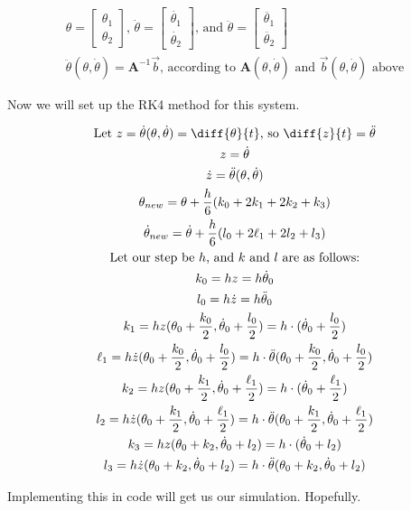\documentclass[]{article}
\begin{document}
\begin{gather*}
	\theta = 
	\begin{bmatrix}
		\theta_1 \\
		\theta_2
	\end{bmatrix} \text{, }
	\dot{\theta} = 
	\begin{bmatrix}
		\dot{\theta_1} \\
		\dot{\theta_2}
	\end{bmatrix} \text{, and }
	\ddot{\theta} =
	\begin{bmatrix}
		\ddot{\theta_1} \\
		\ddot{\theta_2}
	\end{bmatrix} \\
	\ddot{\theta}(\theta, \dot{\theta}) = \boldsymbol{A}^{-1}\vec{b}\text{, according to $\boldsymbol{A}(\theta, \dot{\theta})$ and $\vec{b}(\theta, \dot{\theta})$ above}
\end{gather*}

Now we will set up the RK4 method for this system.

\begin{gather*}
	\text{Let } z = \dot{\theta}(\theta, \dot{\theta}) = \diff{\theta}{t} \text{, so } \diff{z}{t} = \ddot{\theta} \\
	z = \dot{\theta} \\
	\dot{z} = \ddot{\theta}(\theta, \dot{\theta}) \\
	\theta_{new} = \theta + \frac{h}{6}(k_0 + 2k_1 + 2k_2 + k_3) \\
	\dot{\theta}_{new} = \dot{\theta} + \frac{h}{6}(l_0 + 2\ell_1 + 2l_2 + l_3) \\
	\text{Let our step be $h$, and $k$ and $l$ are as follows:}\\
	k_0 = hz = h\dot{\theta}_0 \\
	l_0 = h\dot{z} = h\ddot{\theta}_0 \\
	k_1 = hz(\theta_0 + \frac{k_0}{2}, \dot{\theta}_0 + \frac{l_0}{2}) = h\cdot(\dot{\theta}_0 + \frac{l_0}{2}) \\
	\ell_1 = h\dot{z}(\theta_0 + \frac{k_0}{2}, \dot{\theta}_0 + \frac{l_0}{2}) = h\cdot\ddot{\theta}(\theta_0 + \frac{k_0}{2}, \dot{\theta}_0 + \frac{l_0}{2}) \\
	k_2 = hz(\theta_0 + \frac{k_1}{2}, \dot{\theta}_0 + \frac{\ell_1}{2}) = h\cdot(\dot{\theta}_0 + \frac{\ell_1}{2}) \\
	l_2 = h\dot{z}(\theta_0 + \frac{k_1}{2}, \dot{\theta}_0 + \frac{\ell_1}{2}) = h\cdot\ddot{\theta}(\theta_0 + \frac{k_1}{2}, \dot{\theta}_0 + \frac{\ell_1}{2}) \\
	k_3 = hz(\theta_0 + k_2, \dot{\theta}_0 + l_2) = h\cdot(\dot{\theta}_0 + l_2) \\
	l_3 = h\dot{z}(\theta_0 + k_2, \dot{\theta}_0 + l_2) = h\cdot\ddot{\theta}(\theta_0 + k_2, \dot{\theta}_0 + l_2)
\end{gather*}

Implementing this in code will get us our simulation. Hopefully.
\end{document}
